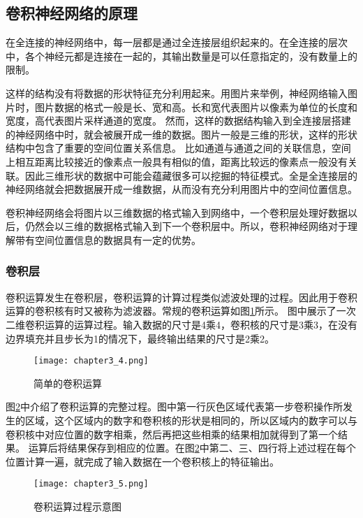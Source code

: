 \subsection{卷积神经网络的原理}
在全连接的神经网络中，每一层都是通过全连接层组织起来的。在全连接的层次中，各个神经元都是连接在一起的，其输出数量是可以任意指定的，没有数量上的限制。

这样的结构没有将数据的形状特征充分利用起来。用图片来举例，神经网络输入图片时，图片数据的格式一般是长、宽和高。长和宽代表图片以像素为单位的长度和宽度，高代表图片采样通道的宽度。
然而，这样的数据结构输入到全连接层搭建的神经网络中时，就会被展开成一维的数据。图片一般是三维的形状，这样的形状结构中包含了重要的空间位置关系信息。
比如通道与通道之间的关联信息，空间上相互距离比较接近的像素点一般具有相似的值，距离比较远的像素点一般没有关联。因此三维形状的数据中可能会蕴藏很多可以挖掘的特征模式。全是全连接层的神经网络就会把数据展开成一维数据，从而没有充分利用图片中的空间位置信息。

卷积神经网络会将图片以三维数据的格式输入到网络中，一个卷积层处理好数据以后，仍然会以三维的数据格式输入到下一个卷积层中。所以，卷积神经网络对于理解带有空间位置信息的数据具有一定的优势。

\subsubsection{卷积层}
卷积运算发生在卷积层，卷积运算的计算过程类似滤波处理的过程。因此用于卷积运算的卷积核有时又被称为滤波器。常规的卷积运算如图\ref{fig:chapter3_4}所示。
图中展示了一次二维卷积运算的运算过程。输入数据的尺寸是4乘4，卷积核的尺寸是3乘3，在没有边界填充并且步长为1的情况下，最终输出结果的尺寸是2乘2。
\begin{figure}
    \centering
    \texttt{[image: chapter3\_4.png]}
    \caption{简单的卷积运算\cite{luyujie_216}}
    \label{fig:chapter3_4}
\end{figure}

图\ref{fig:chapter3_5}中介绍了卷积运算的完整过程。图中第一行灰色区域代表第一步卷积操作所发生的区域，这个区域内的数字和卷积核的形状是相同的，所以区域内的数字可以与卷积核中对应位置的数字相乘，然后再把这些相乘的结果相加就得到了第一个结果。
运算后将结果保存到相应的位置。在图\ref{fig:chapter3_5}中第二、三、四行将上述过程在每个位置计算一遍，就完成了输入数据在一个卷积核上的特征输出。
\begin{figure}
    \centering
    \texttt{[image: chapter3\_5.png]}
    \caption{卷积运算过程示意图\cite{luyujie_216}}
    \label{fig:chapter3_5}
\end{figure}

